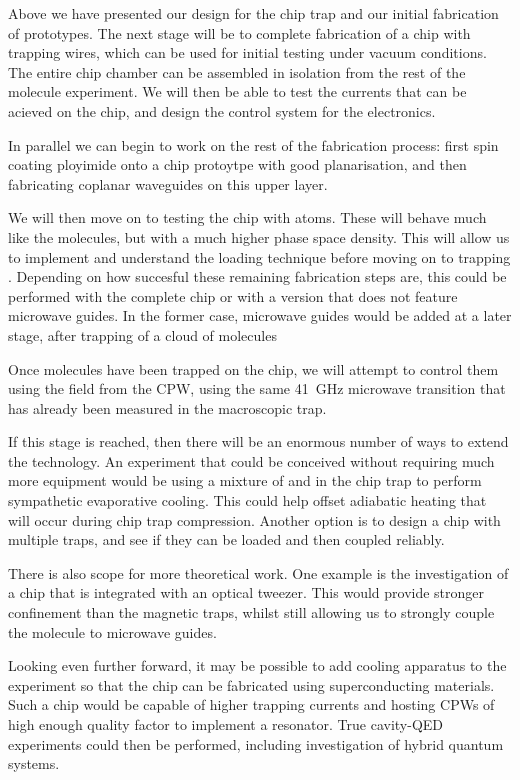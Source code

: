 Above we have presented our design for the chip trap and our initial
fabrication of prototypes. The next stage will be to complete fabrication of a
chip with trapping wires, which can be used for initial testing under vacuum
conditions. The entire chip chamber can be assembled in isolation from the rest
of the molecule experiment. We will then be able to test the currents that can
be acieved on the chip, and design the control system for the electronics.

In parallel we can begin to work on the rest of the fabrication process: first
spin coating ployimide onto a chip protoytpe with good planarisation, and then 
fabricating coplanar waveguides on this upper layer.

We will then move on to testing the chip with \Rb{} atoms. These will behave
much like the \CaF{} molecules, but with a much higher phase space density.
This will allow us to implement and understand the loading technique before
moving on to trapping \CaF{}. Depending on how succesful these remaining
fabrication steps are, this could be performed with the complete chip or with a
version that does not feature microwave guides. In the former case, microwave
guides would be added at a later stage, after trapping of a cloud of molecules 

Once molecules have been trapped on the chip, we will attempt to control them
using the field from the CPW, using the same \SI{41}{\giga\hertz} microwave
transition that has already been measured in the macroscopic trap.

If this stage is reached, then there will be an enormous number of ways to
extend the technology. An experiment that could be conceived without requiring
much more equipment would be using a mixture of \esRb{} and \CaF{} in the chip
trap to perform sympathetic evaporative cooling. This could help offset
adiabatic heating that will occur during chip trap compression. Another option
is to design a chip with multiple traps, and see if they can be loaded and then
coupled reliably.

There is also scope for more theoretical work. One example is the investigation
of a chip that is integrated with an optical tweezer. This would provide
stronger confinement than the magnetic traps, whilst still allowing us to
strongly couple the molecule to microwave guides.

Looking even further forward, it may be possible to add cooling apparatus to
the experiment so that the chip can be fabricated using superconducting
materials. Such a chip would be capable of higher trapping currents and hosting
CPWs of high enough quality factor to implement a resonator. True cavity-QED
experiments could then be performed, including investigation of hybrid quantum
systems.
